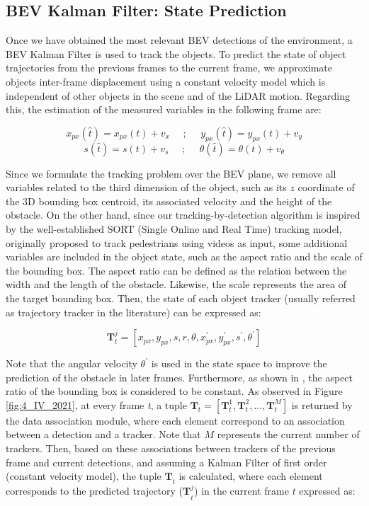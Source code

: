 \subsection{BEV Kalman Filter: State Prediction}
\label{subsec:4_smartmot_state_prediction}

Once we have obtained the most relevant \ac{BEV} detections of the environment, a \ac{BEV} Kalman Filter is used to track the objects. To predict the state of object trajectories from the previous frames to the current frame, we approximate objects inter-frame displacement using a constant velocity model which is independent of other objects in the scene and of the LiDAR motion. Regarding this, the estimation of the measured variables in the following frame are:

\[
x_{px}(\hat{t})=x_{px}(t)+v_{x} \:\:\:\:\:\: ; \:\:\:\:\:\: y_{px}(\hat{t})=y_{px}(t)+v_{y}\]
\[
s(\hat{t})=s(t)+v_{s} \:\:\:\:\:\: ; \:\:\:\:\:\: 
\theta(\hat{t})=\theta(t)+v_{\theta}\]

Since we formulate the tracking problem over the \ac{BEV} plane, we remove all variables related to the third dimension of the object, such as its $\textit{z}$ coordinate of the 3D bounding box centroid, its associated velocity and the height of the obstacle. On the other hand, since our tracking-by-detection algorithm is inspired by the well-established SORT (Single Online and Real Time) \cite{bewley2016simple} tracking model, originally proposed to track pedestrians using videos as input, some additional variables are included in the object state, such as the aspect ratio and the scale of the bounding box. The aspect ratio can be defined as the relation between the width and the length of the obstacle. Likewise, the scale represents the area of the target bounding box. Then, the state of each object tracker (usually referred as trajectory tracker in the literature) can be expressed as:

\begin{equation}
	\label{state}
	\textbf{T}_{t}^{j} = [x_{px},y_{px},s,r,\theta,x_{px}^{'},y_{px}^{'},s^{'},\theta^{'}]
\end{equation}

Note that the angular velocity $\theta^{'}$ is used in the state space to improve the prediction of the obstacle in later frames. Furthermore, as shown in \cite{bewley2016simple}, the aspect ratio of the bounding box is considered to be constant. As observed in Figure \ref{fig:4_IV_2021}, at every frame \textit{t}, a tuple $\textbf{T}_{t}=[\textbf{T}_{t}^{1},\textbf{T}_{t}^{2}, ...,\textbf{T}_{t}^{M}]$ is returned by the data association module, where each element correspond to an association between a detection and a tracker. Note that $M$ represents the current number of trackers. Then, based on these associations between trackers of the previous frame and current detections, and assuming a Kalman Filter of first order (constant velocity model), the tuple $\textbf{T}_{\hat{t}}$ is calculated, where each element corresponds to the predicted trajectory ($\textbf{T}_{\hat{t}}^{j}$) in the current frame $\textit{t}$ expressed as:

